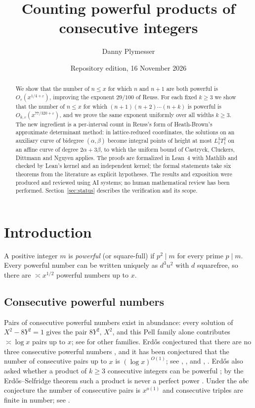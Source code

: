 \documentclass[11pt,reqno]{amsart}
\title{Counting powerful products of consecutive integers}
\author{Danny Plymesser}
\date{Repository edition, 16 November 2026}
\theoremstyle{definition}
\theoremstyle{remark}
\numberwithin{equation}{section}
\begin{document}
\begin{abstract}
We show that the number of $n\le x$ for which $n$ and $n+1$ are both powerful
is $O_\varepsilon(x^{1/4+\varepsilon})$, improving the exponent $29/100$ of
Reuss. For each fixed $k\ge 3$ we show that the number of $n\le x$ for which
$(n+1)(n+2)\cdots(n+k)$ is powerful is $O_{k,\varepsilon}(x^{77/320+\varepsilon})$,
and we prove the same exponent uniformly over all widths $k\ge3$. The new
ingredient is a per-interval count in Reuss's form of Heath-Brown's approximate
determinant method: in lattice-reduced coordinates, the solutions on an
auxiliary curve of bidegree $(\alpha,\beta)$ become integral points of height
at most $L_1^3T_1^2$ on an affine curve of degree $2\alpha+3\beta$, to which
the uniform bound of Castryck, Cluckers, Dittmann and Nguyen applies.
The proofs are formalized in Lean~4 with Mathlib and checked by Lean's kernel
and an independent kernel; the formal statements take six theorems from the
literature as explicit hypotheses. The results and exposition were produced and reviewed
using AI systems; no human mathematical review has been performed.
Section~\ref{sec:status} describes the verification and its scope.
\end{abstract}

\maketitle

\section{Introduction}\label{sec:intro}

A positive integer $m$ is \emph{powerful} (or square-full) if $p^2\mid m$ for
every prime $p\mid m$. Every powerful number can be written uniquely as $d^3u^2$
with $d$ squarefree, so there are $\asymp x^{1/2}$ powerful numbers up to $x$.

\subsection{Consecutive powerful numbers}
Pairs of consecutive powerful numbers exist in abundance: every solution of
$X^2-8Y^2=1$ gives the pair $8Y^2,\,X^2$, and this Pell family alone
contributes $\asymp\log x$ pairs up to $x$; see \cite{Golomb,Walker} for other
families. Erd\H{o}s conjectured that there are no three
consecutive powerful numbers \cite{Erdos76,ErdosManitoba}\cite[Problem \#364]{Bloom}, and it has been
conjectured that the number of consecutive pairs up to $x$ is
$(\log x)^{O(1)}$; see \cite{Erdos76}, \cite[p.~68]{ErdosGraham}, and
\cite[(1.15)]{Tao}, \cite[Problem \#365]{Bloom}. Erd\H{o}s also asked
whether a product of $k\ge3$ consecutive integers can be powerful
\cite[Problem \#137]{Bloom}; by the Erd\H{o}s--Selfridge theorem such a product is
never a perfect power \cite{ErdosSelfridge}. Under the $abc$ conjecture the
number of consecutive pairs is $x^{o(1)}$ and consecutive triples are finite in
number; see \cite[(1.16) and the following discussion]{Tao}.
\end{document}
